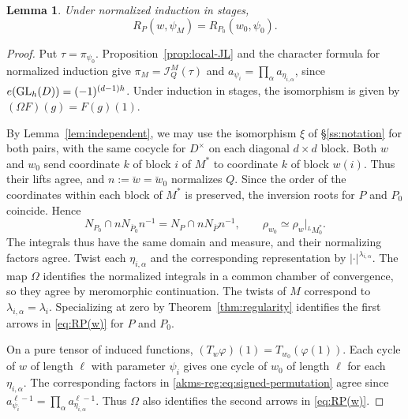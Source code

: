 \documentclass[11pt,reqno]{amsart}
\theoremstyle{plain}
\newtheorem{lem}[thm]{Lemma}
\theoremstyle{definition}
\newcommand{\cI}{\mathcal{I}}
\newcommand{\GL}{\tu{GL}}
\newcommand{\tu}{\textup}
\numberwithin{equation}{subsection}
\begin{document}
\begin{lem}\label{akms-ind:lem:refinement}
Under normalized induction in stages,
\[
 R_P(w,\psi_M)=R_{P_0}(w_0,\psi_0).
\]
\end{lem}
\begin{proof}
Put $\tau=\pi_{\psi_0}$. Proposition~\ref{prop:local-JL} and the
character formula for normalized induction give
$\pi_M=\cI_Q^M(\tau)$ and $a_{\psi_i}=\prod_\alpha a_{\eta_{i,\alpha}}$,
since $e(\GL_h(D))=(-1)^{(d-1)h}$. Under induction in stages, the
isomorphism is given by $(\Omega F)(g)=F(g)(1)$.

By Lemma~\ref{lem:independent}, we may use the isomorphism $\xi$ of
\S\ref{ss:notation} for both pairs, with the same cocycle for $D^\times$
on each diagonal $d\times d$ block. Both $w$ and $w_0$ send coordinate
$k$ of block $i$ of $M^*$ to coordinate $k$ of block $w(i)$. Thus
their lifts agree, and $n:=\breve w=\breve w_0$ normalizes $Q$.
Since the order of the coordinates within each block of $M^*$ is
preserved, the inversion roots for $P$ and $P_0$ coincide. Hence
\[
 N_{P_0}\cap nN_{\overline P_0}n^{-1}
 =N_P\cap nN_{\overline P}n^{-1},\qquad
 \rho_{w_0}\simeq\rho_w|_{{}^LM_0^*}.
\]
The integrals thus have the same domain and measure, and their
normalizing factors agree. Twist each $\eta_{i,\alpha}$ and the
corresponding representation by $|\cdot|^{\lambda_{i,\alpha}}$.
The map $\Omega$ identifies the normalized integrals in a common
chamber of convergence, so they agree by meromorphic continuation.
The twists of $M$ correspond to $\lambda_{i,\alpha}=\lambda_i$.
Specializing at zero by Theorem~\ref{thm:regularity} identifies the
first arrows in \eqref{eq:RP(w)} for $P$ and $P_0$.

On a pure tensor of induced functions,
$(T_w\varphi)(1)=T_{w_0}(\varphi(1))$. Each cycle of $w$ of length
$\ell$ with parameter $\psi_i$ gives one cycle of $w_0$ of length
$\ell$ for each $\eta_{i,\alpha}$. The corresponding factors in
\eqref{akms-reg:eq:signed-permutation} agree since
$a_{\psi_i}^{\ell-1}=\prod_\alpha a_{\eta_{i,\alpha}}^{\ell-1}$.
Thus $\Omega$ also identifies the second arrows in \eqref{eq:RP(w)}.
\end{proof}



\end{document}
